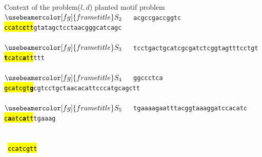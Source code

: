 \documentclass[pdf,xcolor={dvipsnames}]{beamer}
\makeatletter
\newcommand\hcol{%
	\let\set@color\beamerorig@set@color
	\let\reset@color\beamerorig@reset@color}
\newcommand\tcol{\usebeamercolor[fg]{frametitle}}
\newcommand\red{\color{red}}
\makeatother
\begin{document}
\begin{frame}{Context of the problem}{($l,d$) planted motif problem}
{		$\tcol S_2$\ \ \ \texttt{acgccgaccggtc\hcol\hl{ccatc{\red\bf c}tt}gtatagctcctaacgggcatcagc}\ \ \ \ \ \ \\\ \\

		$\tcol S_3$\ \ \ \texttt{tcctgactgcatcgcgatctcggtagtttcctgt\hcol\hl{{\red\bf t}catc{\red\bf a}tt}ttt}\ \ \ \ \ \ \\\ \\

		$\tcol S_4$\ \ \ \texttt{ggccctca\hcol\hl{{\red g}catcgt{\red\bf g}}\color{black}cgtcctgctaacacattcccatgcagctt}\ \ \ \ \ \ \\\ \\
		
		$\tcol S_5$\ \ \ \texttt{\color{black}tgaaaagaatttacggtaaaggatccacatc\hcol\hl{c{\red\bf a}atc{\red\bf a}tt}tgaaag}\ \ \ \ \ \ \\\ \\\ \\

		\color{black}{\em Planted motif: }\texttt{\hcol\hl{ccatcgtt}}\\
	}
	\end{frame}
\end{document}
